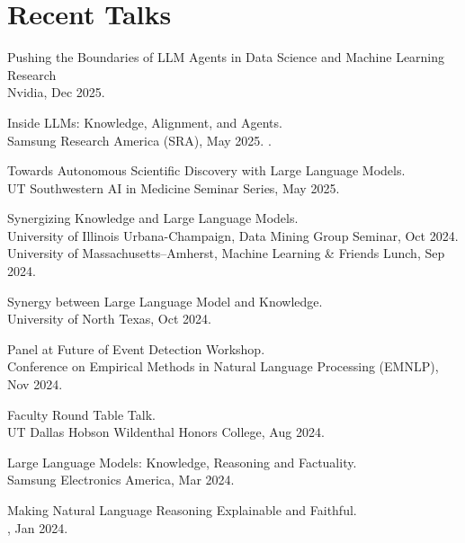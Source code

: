 \section{Recent Talks}

    \noindent Pushing the Boundaries of LLM Agents in Data Science and Machine Learning Research \\
    \indent Nvidia, Dec 2025.

    
    \noindent Inside LLMs: Knowledge, Alignment, and Agents. \\
    \indent Samsung Research America (SRA), May 2025.
.
    
    \noindent Towards Autonomous Scientific Discovery with Large Language Models. \\
    \indent UT Southwestern AI in Medicine Seminar Series, May 2025. 

    
    \noindent Synergizing Knowledge and Large Language Models. \\
    \indent University of Illinois Urbana-Champaign, Data Mining Group Seminar, Oct 2024. \\
    \indent University of Massachusetts--Amherst, Machine Learning \& Friends Lunch, Sep 2024. 

    \noindent Synergy between Large Language Model and Knowledge. \\
    \indent University of North Texas, Oct 2024.

    \noindent Panel at Future of Event Detection Workshop. \\ 
    \indent Conference on Empirical Methods in Natural Language Processing (EMNLP), Nov 2024.
    
    \noindent Faculty Round Table Talk. \\ 
    \indent UT Dallas Hobson Wildenthal Honors College, Aug 2024.

    \noindent Large Language Models: Knowledge, Reasoning and Factuality. \\
    \indent Samsung Electronics America, Mar 2024.


    \noindent Making Natural Language Reasoning Explainable and Faithful. \\
    \indent \AAAI, Jan 2024. 

